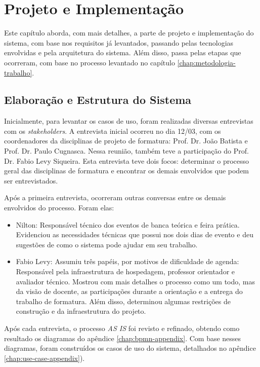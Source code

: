 \chapter{Projeto e Implementação}\label{chap:projeto-implementacao}
Este capítulo aborda, com mais detalhes, a parte de projeto e implementação do sistema, com base nos requisitos já levantados, passando pelas tecnologias envolvidas e pela arquitetura do sistema. Além disso, passa pelas etapas que ocorreram, com base no processo levantado no capítulo \ref{chap:metodologia-trabalho}.

\section{Elaboração e Estrutura do Sistema}
Inicialmente, para levantar os casos de uso, foram realizadas diversas entrevistas com os \textit{stakeholders}. A entrevista inicial ocorreu no dia 12/03, com os coordenadores da disciplinas de projeto de formatura: Prof. Dr. João Batista e Prof. Dr. Paulo Cugnasca. Nessa reunião, também teve a participação do Prof. Dr. Fabio Levy Siqueira. Esta entrevista teve dois focos: determinar o processo geral das disciplinas de formatura e encontrar os demais envolvidos que podem ser entrevistados.

Após a primeira entrevista, ocorreram outras conversas entre os demais envolvidos do processo. Foram elas:

\begin{itemize}
    \item Nilton: Responsável técnico dos eventos de banca teórica e feira prática. Evidenciou as necessidades técnicas que possui nos dois dias de evento e deu sugestões de como o sistema pode ajudar em seu trabalho.
    \item Fabio Levy: Assumiu três papéis, por motivos de dificuldade de agenda: Responsável pela infraestrutura de hospedagem, professor orientador e avaliador técnico. Mostrou com mais detalhes o processo como um todo, mas da visão de docente, as participações durante a orientação e a entrega do trabalho de formatura. Além disso, determinou algumas restrições de construção e da infraestrutura do projeto.
\end{itemize}

Após cada entrevista, o processo \textit{AS IS} foi revisto e refinado, obtendo como resultado os diagramas do apêndice \ref{chap:bpmn-appendix}. Com base nesses diagramas, foram construídos os casos de uso do sistema, detalhados no apêndice \ref{chap:use-case-appendix}). 

